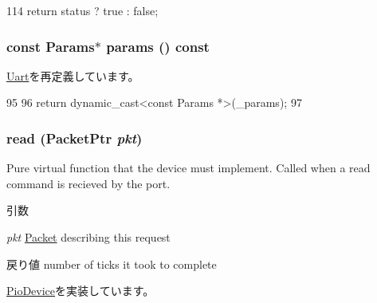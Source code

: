 \begin{DoxyCode}
114 { return status ? true : false; }
\end{DoxyCode}
\hypertarget{classUart8250_acd3c3feb78ae7a8f88fe0f110a718dff}{
\subsubsection[{params}]{\setlength{\rightskip}{0pt plus 5cm}const {\bf Params}$\ast$ params () const}}
\label{classUart8250_acd3c3feb78ae7a8f88fe0f110a718dff}


\hyperlink{classUart_acd3c3feb78ae7a8f88fe0f110a718dff}{Uart}を再定義しています。


\begin{DoxyCode}
95     {
96         return dynamic_cast<const Params *>(_params);
97     }
\end{DoxyCode}
\hypertarget{classUart8250_a613ec7d5e1ec64f8d21fec78ae8e568e}{
\subsubsection[{read}]{ read ({\bf PacketPtr} {\em pkt})}}
\label{classUart8250_a613ec7d5e1ec64f8d21fec78ae8e568e}
Pure virtual function that the device must implement. Called when a read command is recieved by the port. 
\begin{DoxyParams}{引数}
\item[{\em pkt}]\hyperlink{classPacket}{Packet} describing this request \end{DoxyParams}
\begin{DoxyReturn}{戻り値}
number of ticks it took to complete 
\end{DoxyReturn}


\hyperlink{classPioDevice_a842312590432036092c422c87a442358}{PioDevice}を実装しています。



